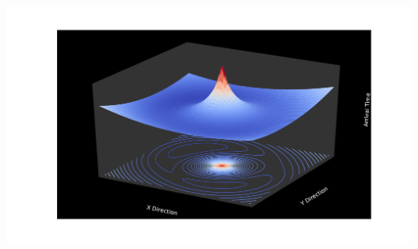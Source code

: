 \documentclass[aspectratio=1610]{beamer}
\begin{document}
\begin{frame}
  \includegraphics[width=\textwidth]{imgs/fig1}
\end{frame}

%
\end{document}
